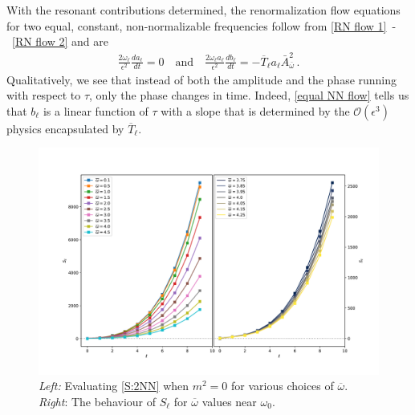 \documentclass[letterpaper,11pt]{article}
\newcommand{\ol}{\omega_\ell}
\newcommand{\mc}{\mathcal}
\newcommand{\ob}{\overline{\omega}}
\begin{document}
With the resonant contributions determined, the renormalization flow equations for two equal, constant, non-normalizable frequencies follow from \eqref{RN flow 1}~-~\eqref{RN flow 2} and are
\begin{align}
\label{equal NN flow}
\frac{2 \ol}{\epsilon^2} \frac{d a_\ell}{dt} =  0 \quad \text{and} \quad \frac{2 \ol a_\ell}{\epsilon^2} \frac{d b_\ell}{d t} = - \overline{T}_\ell a_\ell \bar A^2_{\ob} \, .
\end{align}
Qualitatively, we see that instead of both the amplitude and the phase running with respect to $\tau$, only the phase changes in time. Indeed, \eqref{equal NN flow} tells us that $b_\ell$ is a linear function of $\tau$ with a slope that is determined by the $\mc O(\epsilon^3)$ physics encapsulated by $\overline{T}_\ell$.

\begin{figure}
\centering
\includegraphics[width=\textwidth]{./figures/NN_equalfreq_sourceterms_m0_0+zoom}
\caption{{\it Left:} Evaluating \eqref{S:2NN} when $m^2 = 0$ for various choices of $\ob$. {\it Right}: The behaviour of $S_\ell$ for $\ob$ values near $\omega_0$.}
\label{fig:equal_frequency_m0}
\end{figure}
\end{document}
